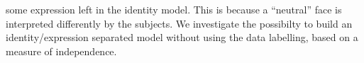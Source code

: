 \documentclass[landscape,a0paper,final,showframe]{baposter}
\begin{document}
\begin{poster}
{    some expression left in the identity model. This is because a ``neutral''
    face is interpreted differently by the subjects. We investigate the
    possibilty to build an identity/expression separated model without using
    the data labelling, based on a measure of independence.
  }%
\end{poster}%
%
\end{document}

